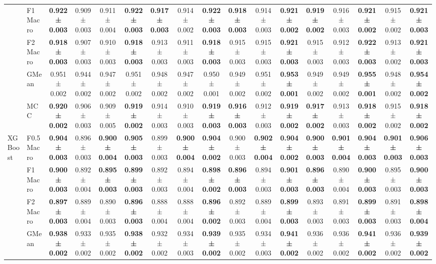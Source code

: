 \begin{table}[H]
{\begin{tabular}{llccccccccccccccc}
 & F1 Macro & \textbf{0.922 ± 0.003} & 0.909 ± 0.003 & 0.911 ± 0.004 & \textbf{0.922 ± 0.003} & \textbf{0.917 ± 0.003} & 0.914 ± 0.002 & \textbf{0.922 ± 0.003} & \textbf{0.918 ± 0.003} & 0.914 ± 0.003 & \textbf{0.921 ± 0.002} & \textbf{0.919 ± 0.002} & 0.916 ± 0.003 & \textbf{0.921 ± 0.002} & 0.915 ± 0.002 & \textbf{0.921 ± 0.003} \\
 & F2 Macro & \textbf{0.918 ± 0.003} & 0.907 ± 0.003 & 0.910 ± 0.003 & \textbf{0.918 ± 0.003} & 0.913 ± 0.003 & 0.911 ± 0.003 & \textbf{0.918 ± 0.003} & 0.915 ± 0.003 & 0.915 ± 0.003 & \textbf{0.921 ± 0.003} & 0.915 ± 0.003 & 0.912 ± 0.003 & \textbf{0.922 ± 0.003} & 0.913 ± 0.002 & \textbf{0.921 ± 0.003} \\
 & GMean & 0.951 ± 0.002 & 0.944 ± 0.002 & 0.947 ± 0.002 & 0.951 ± 0.002 & 0.948 ± 0.002 & 0.947 ± 0.002 & 0.950 ± 0.001 & 0.949 ± 0.002 & 0.951 ± 0.002 & \textbf{0.953 ± 0.001} & 0.949 ± 0.002 & 0.949 ± 0.002 & \textbf{0.955 ± 0.001} & 0.948 ± 0.002 & \textbf{0.954 ± 0.002} \\
 & MCC & \textbf{0.920 ± 0.002} & 0.906 ± 0.003 & 0.909 ± 0.005 & \textbf{0.919 ± 0.002} & 0.914 ± 0.003 & 0.910 ± 0.003 & \textbf{0.919 ± 0.003} & \textbf{0.916 ± 0.003} & 0.912 ± 0.003 & \textbf{0.919 ± 0.002} & \textbf{0.917 ± 0.002} & 0.913 ± 0.003 & \textbf{0.918 ± 0.002} & 0.915 ± 0.002 & \textbf{0.918 ± 0.002} \\
\cline{1-17}
\multirow[t]{5}{*}{XGBoost} & F0.5 Macro & \textbf{0.904 ± 0.003} & 0.896 ± 0.003 & \textbf{0.900 ± 0.004} & \textbf{0.905 ± 0.003} & 0.899 ± 0.003 & \textbf{0.900 ± 0.004} & \textbf{0.904 ± 0.002} & 0.900 ± 0.003 & \textbf{0.902 ± 0.004} & \textbf{0.904 ± 0.002} & \textbf{0.900 ± 0.003} & \textbf{0.901 ± 0.004} & \textbf{0.904 ± 0.003} & \textbf{0.901 ± 0.003} & \textbf{0.906 ± 0.003} \\
 & F1 Macro & \textbf{0.900 ± 0.003} & 0.892 ± 0.004 & \textbf{0.895 ± 0.003} & \textbf{0.899 ± 0.003} & 0.892 ± 0.003 & 0.894 ± 0.004 & \textbf{0.898 ± 0.002} & \textbf{0.896 ± 0.003} & 0.894 ± 0.003 & \textbf{0.901 ± 0.003} & \textbf{0.896 ± 0.003} & 0.890 ± 0.004 & \textbf{0.900 ± 0.003} & 0.895 ± 0.003 & \textbf{0.900 ± 0.003} \\
 & F2 Macro & \textbf{0.897 ± 0.003} & 0.889 ± 0.004 & 0.890 ± 0.003 & \textbf{0.896 ± 0.003} & 0.888 ± 0.004 & 0.888 ± 0.004 & \textbf{0.896 ± 0.002} & 0.892 ± 0.003 & 0.889 ± 0.004 & \textbf{0.899 ± 0.003} & 0.893 ± 0.003 & 0.891 ± 0.003 & \textbf{0.899 ± 0.003} & 0.891 ± 0.003 & \textbf{0.898 ± 0.004} \\
 & GMean & \textbf{0.938 ± 0.002} & 0.933 ± 0.002 & 0.935 ± 0.002 & \textbf{0.938 ± 0.002} & 0.932 ± 0.002 & 0.934 ± 0.003 & \textbf{0.939 ± 0.002} & 0.935 ± 0.002 & 0.934 ± 0.003 & \textbf{0.941 ± 0.002} & 0.936 ± 0.002 & 0.936 ± 0.002 & \textbf{0.941 ± 0.002} & 0.936 ± 0.002 & \textbf{0.939 ± 0.002} \\

\end{tabular}}
\end{table}
